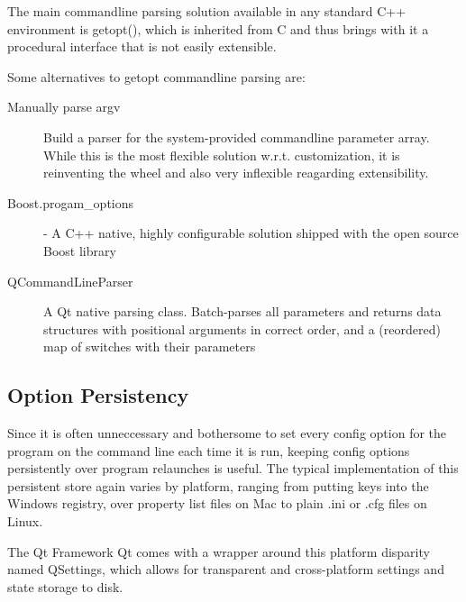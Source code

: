 The main commandline parsing solution available in any standard C++ environment is getopt(), which is inherited from C and thus brings with it a procedural interface that is not easily extensible.

Some alternatives to getopt commandline parsing are:
\begin{description}
\item [Manually parse argv] Build a parser for the system-provided commandline parameter array. While this is the most flexible solution w.r.t. customization, it is reinventing the wheel and also very inflexible reagarding extensibility.
\item [Boost.progam\_options] - A C++ native, highly configurable solution shipped with the open source Boost library
\item [QCommandLineParser] A Qt native parsing class. Batch-parses all parameters and returns data structures with positional arguments in correct order, and a (reordered) map of switches with their parameters
\end{description}



\subsection{Option Persistency}
Since it is often unneccessary and bothersome to set every config option for the program on the command line each time it is run, keeping config options persistently over program relaunches is useful. The typical implementation of this persistent store again varies by platform, ranging from putting keys into the Windows registry, over property list files on Mac to plain .ini or .cfg files on Linux.

The Qt Framework Qt comes with a wrapper around this platform disparity named QSettings, which allows for transparent and cross-platform settings and state storage to disk.


